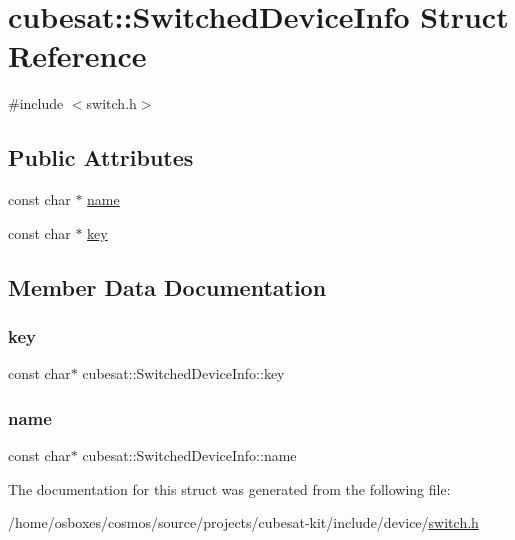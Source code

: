 \hypertarget{structcubesat_1_1SwitchedDeviceInfo}{}\section{cubesat\+:\+:Switched\+Device\+Info Struct Reference}
\label{structcubesat_1_1SwitchedDeviceInfo}


{\ttfamily \#include $<$switch.\+h$>$}

\subsection*{Public Attributes}
\begin{DoxyCompactItemize}
\item 
const char $\ast$ \hyperlink{structcubesat_1_1SwitchedDeviceInfo_af97bff5ec9cd74494f48898e3760f3d2}{name}
\item 
const char $\ast$ \hyperlink{structcubesat_1_1SwitchedDeviceInfo_a371a34c9f27a2296ffe713ca5fd8d2ad}{key}
\end{DoxyCompactItemize}


\subsection{Member Data Documentation}
\mbox{\label{structcubesat_1_1SwitchedDeviceInfo_a371a34c9f27a2296ffe713ca5fd8d2ad}} 
\subsubsection{\texorpdfstring{key}{key}}
{\footnotesize\ttfamily const char$\ast$ cubesat\+::\+Switched\+Device\+Info\+::key}

\mbox{\label{structcubesat_1_1SwitchedDeviceInfo_af97bff5ec9cd74494f48898e3760f3d2}} 
\subsubsection{\texorpdfstring{name}{name}}
{\footnotesize\ttfamily const char$\ast$ cubesat\+::\+Switched\+Device\+Info\+::name}



The documentation for this struct was generated from the following file\+:\begin{DoxyCompactItemize}
\item 
/home/osboxes/cosmos/source/projects/cubesat-\/kit/include/device/\hyperlink{switch_8h}{switch.\+h}\end{DoxyCompactItemize}
